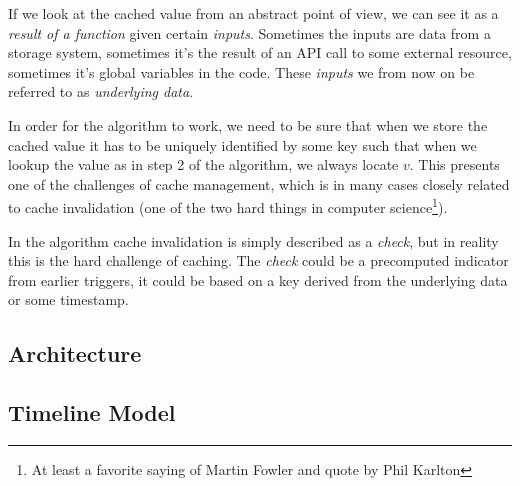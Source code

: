 If we look at the cached value from an abstract point of view, we can see it
as a \emph{result of a function} given certain \emph{inputs}. Sometimes the
inputs are data from a storage system, sometimes it's the result of an API call
to some external resource, sometimes it's global variables in the code. These
\emph{inputs} we from now on be referred to as \emph{underlying data}.

In order for the algorithm to work, we need to be sure that when we store
the cached value it has to be uniquely identified by some key such that when
we lookup the value as in step 2 of the algorithm, we always locate $v$. This
presents one of the challenges of cache management, which is in many cases
closely related to cache invalidation (one of the two hard things in computer science\footnote{At least a favorite saying of Martin Fowler and quote by Phil Karlton}).

In the algorithm cache invalidation is simply described as a \emph{check}, but
in reality this is the hard challenge of caching. The \emph{check} could be
a precomputed indicator from earlier triggers, it could be based on a key
derived from the underlying data or some timestamp.




%

\subsection{Architecture}
\label{subsec:architecture}



\subsection{Timeline Model}
\label{subsec:timeline_model}



